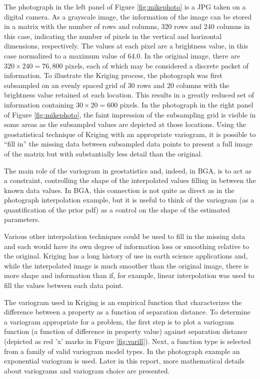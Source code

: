 \documentclass[11pt,oneside,onecolumn]{usgsreport}
\begin{document}
\begin{multicols}{2}
\begin{bibunit}
The photograph in the left panel of Figure \ref{fig:mikephoto} is
a JPG taken on a digital camera. As a grayscale image, the information
of the image can be stored in a matrix with the number of rows and
columns, 320 rows and 240 columns in this case, indicating the number
of pixels in the vertical and horizontal dimensions, respectively.
The values at each pixel are a brightness value, in this case normalized
to a maximum value of 64.0. In the original image, there are $320\times240=76,800$
pixels, each of which may be considered a discrete packet of information.
To illustrate the Kriging process, the photograph was first subsampled
on an evenly spaced grid of 30 rows and 20 columns with the brightness
value retained at each location. This results in a greatly reduced
set of information containing $30\times20=600$ pixels. In the photograph
in the right panel of Figure \ref{fig:mikephoto}, the faint impression
of the subsampling grid is visible in some areas as the subsampled
values are depicted at those locations. Using the geostatistical technique
of Kriging with an appropriate variogram, it is possible to ``fill
in'' the missing data between subsampled data points to present a
full image of the matrix but with substantially less detail than the
original. 

The main role of the variogram in geostatistics and, indeed, in BGA,
is to act as a constraint, controlling the shape of the interpolated
values filling in between the known data values. In BGA, this connection
is not quite as direct as in the photograph interpolation example,
but it is useful to think of the variogram (as a quantification of
the prior pdf) as a control on the shape of the estimated parameters. 

Various other interpolation techniques could be used to fill in the
missing data and each would have its own degree of information loss
or smoothing relative to the original. Kriging has a long history
of use in earth science applications and, while the interpolated image
is much smoother than the original image, there is more shape and
information than if, for example, linear interpolation was used to
fill the values between each data point.

The variogram used in Kriging is an empirical function that characterizes
the difference between a property as a function of separation distance.
To determine a variogram appropriate for a problem, the first step
is to plot a variogram function (a function of difference in property
value) against separation distance (depicted as red 'x' marks in Figure
\ref{fig:varill}). Next, a function type is selected from a family
of valid variogram model types. In the photograph example an exponential
variogram is used. Later in this report, more mathematical details
about variograms and variogram choice are presented.


\end{bibunit}
\end{multicols}
\end{document}
